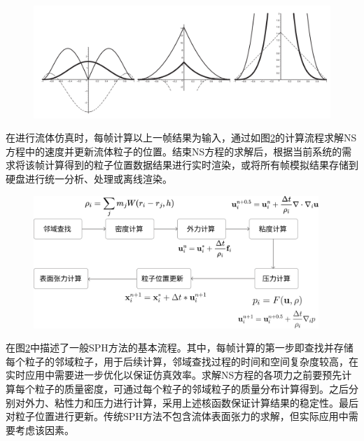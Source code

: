 \begin{figure}[ht]
 \centering
 \includegraphics[width=1.0\linewidth]{image/threekernel.png}
 \label{fig:threekernel}
\end{figure}




在进行流体仿真时，每帧计算以上一帧结果为输入，通过如图\ref{fig:pipeline1}的计算流程求解NS方程中的速度并更新流体粒子的位置。结束NS方程的求解后，根据当前系统的需求将该帧计算得到的粒子位置数据结果进行实时渲染，或将所有帧模拟结果存储到硬盘进行统一分析、处理或离线渲染。

\begin{figure}[ht]
 \centering
 \includegraphics[height=5cm]{image/pic1.png}
 \label{fig:pipeline1}
\end{figure}

在图\ref{fig:pipeline1}中描述了一般SPH方法的基本流程。其中，每帧计算的第一步即查找并存储每个粒子的邻域粒子，用于后续计算，邻域查找过程的时间和空间复杂度较高，在实时应用中需要进一步优化以保证仿真效率。求解NS方程的各项力之前要预先计算每个粒子的质量密度，可通过每个粒子的邻域粒子的质量分布计算得到。之后分别对外力、粘性力和压力进行计算，采用上述核函数保证计算结果的稳定性。最后对粒子位置进行更新。传统SPH方法不包含流体表面张力的求解，但实际应用中需要考虑该因素。

